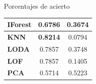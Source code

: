 \documentclass[10pt]{beamer}
\begin{document}
\begin{frame}[fragile]{Porcentajes de acierto}
\begin{table}[H]
\begin{tabulary}{\textwidth}{|l|c|c|}
			\textbf{IForest}                      & 0.6786                                                                            & 0.3674                                                                    \\ \hline
			\textbf{KNN}                          & \textbf{0.8214}                                                                   & 0.0794                                                                    \\ \hline
			\textbf{LODA}                         & 0.7857                                                                            & 0.3748                                                                    \\ \hline
			\textbf{LOF}                          & 0.7857                                                                            & 0.1405                                                                    \\ \hline
			\textbf{PCA}                          & 0.5714                                                                            & 0.5223                                                                    \\ \hline
		\end{tabulary}
	\end{table}
	
\end{frame}
\end{document}
